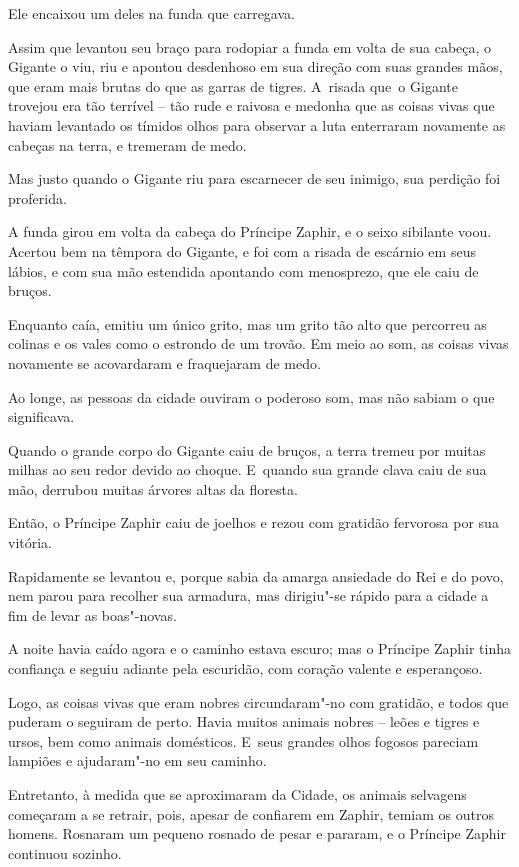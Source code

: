 Ele encaixou um deles na funda que carregava.

Assim que levantou seu braço para rodopiar a funda em volta de sua
cabeça, o Gigante o viu, riu e apontou desdenhoso em sua direção com
suas grandes mãos, que eram mais brutas do que as garras de tigres. A~risada que~o Gigante trovejou era tão terrível -- tão rude e raivosa e
medonha que as coisas vivas que haviam levantado os tímidos olhos para
observar a luta enterraram novamente as cabeças na terra, e tremeram de
medo.

Mas justo quando o Gigante riu para escarnecer de seu inimigo, sua
perdição foi proferida.

A funda girou em volta da cabeça do Príncipe Zaphir, e o seixo sibilante
voou. Acertou bem na têmpora do Gigante, e foi com a risada de escárnio
em seus lábios, e com sua mão estendida apontando com menosprezo, que
ele caiu de bruços.

Enquanto caía, emitiu um único grito, mas um grito tão alto que
percorreu as colinas e os vales como o estrondo de um trovão. Em meio ao
som, as coisas vivas novamente se acovardaram e fraquejaram de medo.

\smallskip
Ao longe, as pessoas da cidade ouviram o poderoso som, mas não
sabiam o que significava.

Quando o grande corpo do Gigante caiu de bruços, a terra tremeu por
muitas milhas ao seu redor devido ao choque. E~quando sua grande clava caiu
de sua mão, derrubou muitas árvores altas da floresta.

Então, o Príncipe Zaphir caiu de joelhos e rezou com gratidão fervorosa
por sua vitória.

Rapidamente se levantou e, porque sabia da amarga ansiedade do Rei e do
povo, nem parou para recolher sua armadura, mas dirigiu"-se rápido para a
cidade a fim de levar as boas"-novas.

A noite havia caído agora e o caminho estava escuro; mas o Príncipe
Zaphir tinha confiança e seguiu adiante pela escuridão, com coração
valente e esperançoso.

Logo, as coisas vivas que eram nobres circundaram"-no com gratidão, e
todos que puderam o seguiram de perto. Havia muitos animais nobres --
leões e tigres e ursos, bem como animais domésticos. E~seus grandes
olhos fogosos pareciam lampiões e ajudaram"-no em seu caminho.

Entretanto, à medida que se aproximaram da Cidade, os animais selvagens
começaram a se retrair, pois, apesar de confiarem em Zaphir, temiam os
outros homens. Rosnaram um pequeno rosnado de pesar e pararam, e o
Príncipe Zaphir continuou sozinho.

